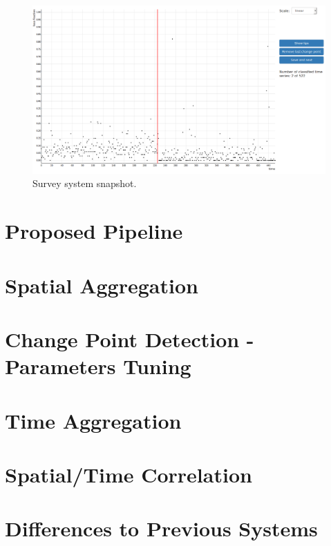 \begin{figure}[H]
    \centering
    \includegraphics[width=0.9\linewidth]{./figures/methodology/supervised_learning_try/survey_system.png}
    \caption{Survey system snapshot.}
    \label{fig:survey_system}
\end{figure}%

\section{Proposed Pipeline}
\section{Spatial Aggregation}
\section{Change Point Detection - Parameters Tuning}
\section{Time Aggregation}
\section{Spatial/Time Correlation}
\section{Differences to Previous Systems}

